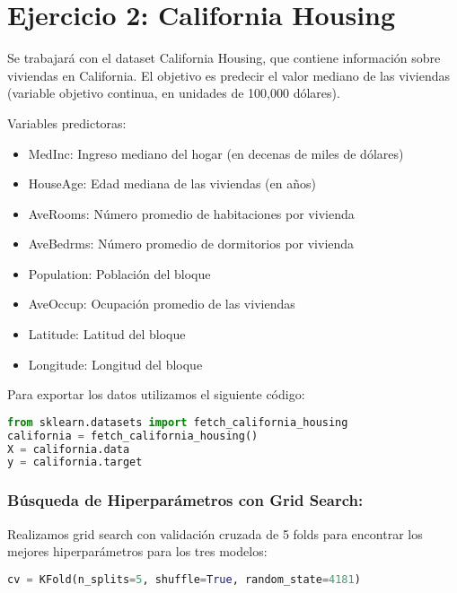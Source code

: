 \documentclass[12pt,a4paper]{article}
\begin{document}
\section{Ejercicio 2: California Housing}

Se trabajará con el dataset California Housing, que contiene información sobre viviendas en California.
El objetivo es predecir el valor mediano de las viviendas (variable objetivo continua, en unidades de
100,000 dólares).

\vspace{0.5cm}

Variables predictoras:
\begin{itemize}
\item MedInc: Ingreso mediano del hogar (en decenas de miles de dólares)
\item HouseAge: Edad mediana de las viviendas (en años)
\item AveRooms: Número promedio de habitaciones por vivienda
\item AveBedrms: Número promedio de dormitorios por vivienda
\item Population: Población del bloque
\item AveOccup: Ocupación promedio de las viviendas
\item Latitude: Latitud del bloque
\item Longitude: Longitud del bloque
\end{itemize}

Para exportar los datos utilizamos el siguiente código:

\begin{lstlisting}[language=Python, frame=single, basicstyle=\ttfamily\small, breaklines=true]
from sklearn.datasets import fetch_california_housing
california = fetch_california_housing()
X = california.data
y = california.target
\end{lstlisting}

\subsubsection{Búsqueda de Hiperparámetros con Grid Search:}
Realizamos grid search con validación cruzada de 5 folds para encontrar los mejores hiperparámetros para los tres modelos:

\begin{lstlisting}[language=Python, frame=single, basicstyle=\ttfamily\small, breaklines=true]
cv = KFold(n_splits=5, shuffle=True, random_state=4181)
\end{lstlisting}
\end{document}
